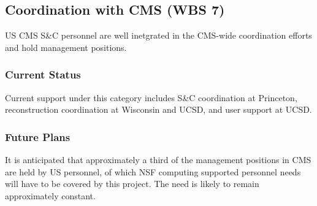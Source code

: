 \documentclass[11pt,a4paper]{article}
\begin{document}
\subsection{Coordination with CMS (WBS 7)}

US CMS S\&C personnel are well inetgrated in the CMS-wide coordination
efforts and hold management positions.  

\subsubsection{Current Status}

Current support under this category includes S\&C coordination at
Princeton, reconstruction coordination at Wisconsin and UCSD, and user
support at UCSD.  

\subsubsection{Future Plans}

It is anticipated that approximately a third of the management positions
in CMS are held by US personnel, of which NSF computing supported 
personnel needs will have to be covered by this project.  The need
is likely to remain approximately constant.
\end{document}

